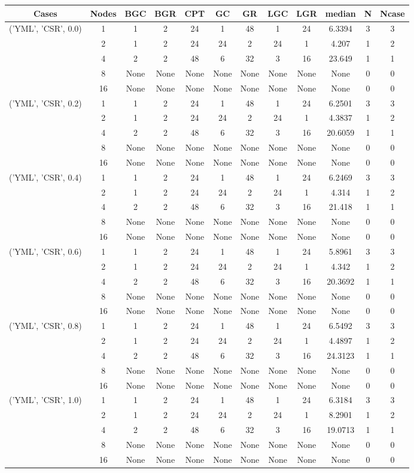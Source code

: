 \begin{tabular}{cccccccccccc}
\hline
Cases & Nodes& BGC& BGR& CPT& GC& GR& LGC& LGR& median & N & Ncase \\
\hline
\multirow{5}{*}{('YML', 'CSR', 0.0)}& 1& 1& 2& 24& 1& 48& 1& 24& 6.3394& 3& 3\\
& 2& 1& 2& 24& 24& 2& 24& 1& 4.207& 1& 2\\
& 4& 2& 2& 48& 6& 32& 3& 16& 23.649& 1& 1\\
& 8& None& None& None& None& None& None& None& None& 0& 0\\
& 16& None& None& None& None& None& None& None& None& 0& 0\\
\hline
\multirow{5}{*}{('YML', 'CSR', 0.2)}& 1& 1& 2& 24& 1& 48& 1& 24& 6.2501& 3& 3\\
& 2& 1& 2& 24& 24& 2& 24& 1& 4.3837& 1& 2\\
& 4& 2& 2& 48& 6& 32& 3& 16& 20.6059& 1& 1\\
& 8& None& None& None& None& None& None& None& None& 0& 0\\
& 16& None& None& None& None& None& None& None& None& 0& 0\\
\hline
\multirow{5}{*}{('YML', 'CSR', 0.4)}& 1& 1& 2& 24& 1& 48& 1& 24& 6.2469& 3& 3\\
& 2& 1& 2& 24& 24& 2& 24& 1& 4.314& 1& 2\\
& 4& 2& 2& 48& 6& 32& 3& 16& 21.418& 1& 1\\
& 8& None& None& None& None& None& None& None& None& 0& 0\\
& 16& None& None& None& None& None& None& None& None& 0& 0\\
\hline
\multirow{5}{*}{('YML', 'CSR', 0.6)}& 1& 1& 2& 24& 1& 48& 1& 24& 5.8961& 3& 3\\
& 2& 1& 2& 24& 24& 2& 24& 1& 4.342& 1& 2\\
& 4& 2& 2& 48& 6& 32& 3& 16& 20.3692& 1& 1\\
& 8& None& None& None& None& None& None& None& None& 0& 0\\
& 16& None& None& None& None& None& None& None& None& 0& 0\\
\hline
\multirow{5}{*}{('YML', 'CSR', 0.8)}& 1& 1& 2& 24& 1& 48& 1& 24& 6.5492& 3& 3\\
& 2& 1& 2& 24& 24& 2& 24& 1& 4.4897& 1& 2\\
& 4& 2& 2& 48& 6& 32& 3& 16& 24.3123& 1& 1\\
& 8& None& None& None& None& None& None& None& None& 0& 0\\
& 16& None& None& None& None& None& None& None& None& 0& 0\\
\hline
\multirow{5}{*}{('YML', 'CSR', 1.0)}& 1& 1& 2& 24& 1& 48& 1& 24& 6.3184& 3& 3\\
& 2& 1& 2& 24& 24& 2& 24& 1& 8.2901& 1& 2\\
& 4& 2& 2& 48& 6& 32& 3& 16& 19.0713& 1& 1\\
& 8& None& None& None& None& None& None& None& None& 0& 0\\
& 16& None& None& None& None& None& None& None& None& 0& 0\\
\hline
\end{tabular}


